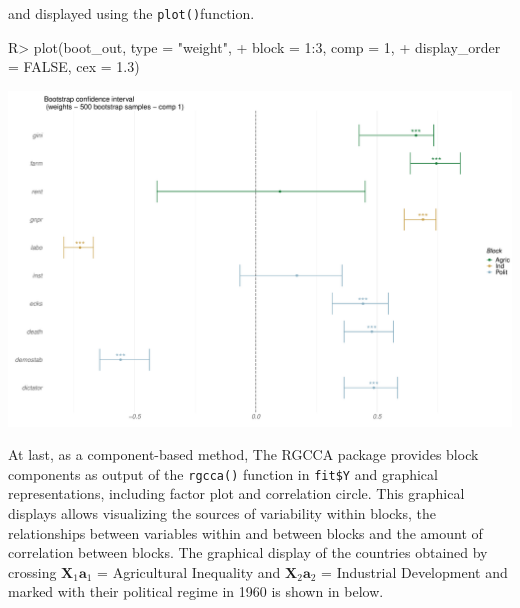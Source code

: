 \documentclass[
]{jss}
\begin{document}
\normalsize

and displayed using the \texttt{plot()}function.

\footnotesize

\begin{CodeChunk}
\begin{CodeInput}
R> plot(boot_out, type = "weight", 
+      block = 1:3, comp = 1, 
+      display_order = FALSE, cex = 1.3)
\end{CodeInput}


\begin{center}\includegraphics{RGCCA_files/figure-latex/unnamed-chunk-10-1} \end{center}

\end{CodeChunk}

\normalsize

At last, as a component-based method, The RGCCA package provides block
components as output of the \texttt{rgcca()} function in \texttt{fit\$Y}
and graphical representations, including factor plot and correlation
circle. This graphical displays allows visualizing the sources of
variability within blocks, the relationships between variables within
and between blocks and the amount of correlation between blocks. The
graphical display of the countries obtained by crossing
\(\ensuremath{\mathbf{X}}_1 \ensuremath{\mathbf{a}}_1\) = Agricultural
Inequality and \(\ensuremath{\mathbf{X}}_2 \ensuremath{\mathbf{a}}_2\) =
Industrial Development and marked with their political regime in 1960 is
shown in below.

\footnotesize
\end{document}
